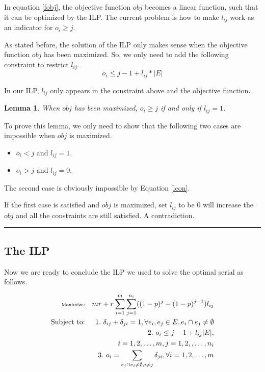 \documentclass[letterpaper]{article}
\newenvironment{proof}{{Proof:}}{\hfill\rule{2mm}{2mm}}
\newtheorem{lemma}{Lemma}
\begin{document}
In equation \ref{fobj}, the objective function $obj$ becomes a linear function, such that it can be optimized by the ILP.
The current problem is how to make $l_{ij}$ work as an indicator for $o_i\geq j$.

As stated before, the solution of the ILP only makes sense when the objective function $obj$ has been maximized.
So, we only need to add the following constraint to restrict $l_{ij}$.
\begin{equation}
o_i\leq j-1+l_{ij}*|E|\label{lcon}
\end{equation}

In our ILP, $l_{ij}$ only appears in the constraint above and the objective function.

\begin{lemma}\label{lmm}
	When $obj$ has been maximized, $o_i\geq j$ if and only if $l_{ij}=1$.
\end{lemma}
\begin{proof}
	To prove this lemma, we only need to show that the following two cases are impossible when $obj$ is maximized.
	\begin{itemize}
		\item $o_i<j$ and $l_{ij}=1$.
		\item $o_i>j$ and $l_{ij}=0$.
	\end{itemize}
	The second case is obviously impossible by Equation \ref{lcon}.
	
	If the first case is satisfied and $obj$ is maximized, set $l_{ij}$ to be 0 will increase the $obj$ and all the constraints are still satisfied. A contradiction.
\end{proof}

\subsection{The ILP}
Now we are ready to conclude the ILP we used to solve the optimal serial as follows.

\begin{eqnarray}
\tiny
\text{Maximize:}&& mr+r\sum_{i=1}^{m}\sum_{j=1}^{n_i}((1-p)^j-(1-p)^{j-1})l_{ij}\label{stobj}\\
\text{Subject to:}&& 1.~\delta_{ij}+\delta_{ji}=1, \forall e_i,e_j\in E, e_i\cap e_j\neq \emptyset \label{con1}\\
&& 2.~o_i\leq j-1+l_{ij}|E|,\nonumber\\&&~~~i=1,2,\ldots,m, j=1,2,,\ldots,n_i\label{ni}\\
&& 3.~o_i=\sum_{e_j\cap e_i\neq \emptyset,i\neq j}\delta_{ji}, \forall i=1,2,\ldots,m \label{oo}
\end{eqnarray}
\end{document}
